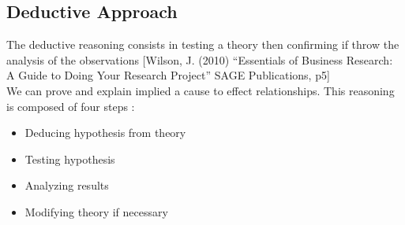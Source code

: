 \subsection{Deductive Approach}
The deductive reasoning consists in testing a theory then confirming if throw the analysis of the observations  [Wilson, J. (2010) “Essentials of Business Research: A Guide to Doing Your Research Project” SAGE Publications, p5] \cite{buisnessREsearchWilson}\\
We can prove and explain implied a cause to effect relationships.
This reasoning is composed of four steps :
\begin{itemize}
\item Deducing hypothesis from theory
\item Testing hypothesis
\item Analyzing results %
\item Modifying theory if necessary
\end{itemize}


